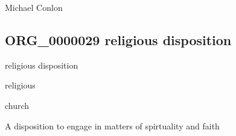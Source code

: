 \documentclass[letterpaper,10pt,english]{sphinxmanual}
\begin{document}
\begin{sphinxShadowBox}

\sphinxAtStartPar
Michael Conlon 
\end{sphinxShadowBox}
\begin{quote}

\ignorespaces \end{quote}


\subsection{ORG\_0000029 \sphinxhyphen{} religious disposition}
\label{\detokenize{doc-ORG_0000029:org-0000029-religious-disposition}}\label{\detokenize{doc-ORG_0000029:index-0}}\label{\detokenize{doc-ORG_0000029::doc}}
\begin{sphinxShadowBox}

\sphinxAtStartPar
religious disposition
\end{sphinxShadowBox}

\begin{sphinxShadowBox}

\sphinxAtStartPar
religious
\end{sphinxShadowBox}

\begin{sphinxShadowBox}

\sphinxAtStartPar
church
\end{sphinxShadowBox}

\begin{sphinxShadowBox}

\sphinxAtStartPar
{\hyperref[\detokenize{doc-BFO_0000016::doc}]{}}
\end{sphinxShadowBox}

\begin{sphinxShadowBox}

\sphinxAtStartPar
A disposition to engage in matters of spirtuality and faith
\end{sphinxShadowBox}
\end{document}
